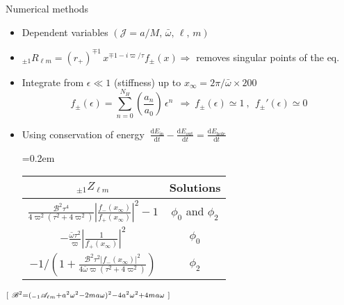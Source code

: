 \documentclass[9pt]{beamer}
\newcommand{\dd}{\mathrm{d}}
\newcommand{\uu}[3][]{ {}_{#1} #2_{#3} }
\begin{document}
\begin{frame}{Numerical methods}
	\begin{itemize}
		\setlength\itemsep{1em}

		\item Dependent variables $(\mathscr{J} = a/M, \,\bar{\omega}, \, \ell, \, m)$
		
		\item
		$\uu[\pm 1]{R}{\ell m} = (r_+)^{\mp 1} \, x^{ \mp 1 - i \varpi / \tau} f_{\pm}(x) \Rightarrow$ removes singular points of the eq.
		
		\item
		Integrate from $\epsilon\ll 1$ (stiffness) up to $x_\infty = 2\pi/\bar{\omega} \times 200$
		$$ f_{\pm}(\epsilon) = \sum_{n=0}^{N_H} \left(\frac{a_n}{a_0}\right)
		\,\epsilon^n ~~\Rightarrow~ f_{\pm}{}(\epsilon) \simeq 1 ~,~~ f_{\pm}{}'(\epsilon) \simeq 0$$
		
		\item
		Using conservation of energy $~\frac{\dd E_\mathrm{in}}{\dd t} - \frac{\dd E_\mathrm{out}}{\dd t} = \frac{\dd E_\mathrm{hole}}{\dd t}$
		\\[0.3cm]
		\begin{center}
			\tabulinesep=0.2em
			\begin{tabu}{@{\hskip 0.25cm}c@{\hskip 0.75cm}c@{\hskip 0.75cm}}
				\hline
				$\uu[\pm 1]{Z}{\ell m}$ & Solutions \\
				\hline\hline
				$\frac{\mathscr{B}^2 \tau^4 }{4 \varpi^2 (\tau^2 + 4 \varpi^2)} \left| \frac{f_{-}(x_\infty)}{f_{+}(x_\infty)} \right|^2 - 1$ & 
				$\phi_0$ and $\phi_2$ \\
				\hline
				$- \frac{\bar{\omega} \tau^2}{\varpi} \left|\frac{1}{f_{+}(x_\infty)}\right|^2$ &
				$\phi_0$ \\
				\hline
				$-1\bigg/\left( 1 + \frac{\mathscr{B}^2 \tau^2 \left|f_{-}(x_\infty)\right|^2}{4 \bar{\omega} \varpi(\tau^2 + 4 \varpi^2)} \right)$ & $\phi_2$ \\
				\hline
			\end{tabu}
		\end{center}
	\end{itemize}
	\vspace*{0.3cm}
	$\hfill\scriptstyle [~ \mathscr{B}^2 = ( \uu[-1]{\mathscr{A}}{\ell m} + a^2\omega^2 - 2 m a \omega )^2 - 4 a^2\omega^2 + 4 m a \omega ~]$
\end{frame}
\end{document}
